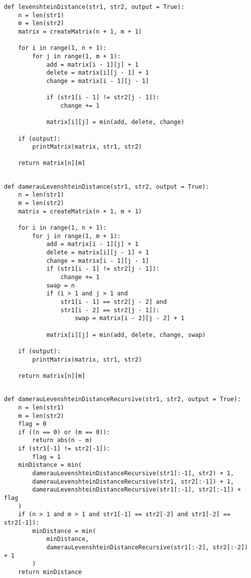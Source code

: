 \begin{lstlisting}[label=lst:non_rec_l,caption=Функция нахождения расстояния Левенштейна нерекурсивным методом]
def levenshteinDistance(str1, str2, output = True):
    n = len(str1)
    m = len(str2)
    matrix = createMatrix(n + 1, m + 1)

    for i in range(1, n + 1):
        for j in range(1, m + 1):
            add = matrix[i - 1][j] + 1
            delete = matrix[i][j - 1] + 1
            change = matrix[i - 1][j - 1]

            if (str1[i - 1] != str2[j - 1]):
                change += 1

            matrix[i][j] = min(add, delete, change)

    if (output):
        printMatrix(matrix, str1, str2)

    return matrix[n][m]
	
\end{lstlisting}

\begin{lstlisting}[label=lst:non_rec_dl,caption=Функция нахождения расстояния Дамерау--Левенштейна нерекурсивным методом]
def damerauLevenshteinDistance(str1, str2, output = True):
    n = len(str1)
    m = len(str2)
    matrix = createMatrix(n + 1, m + 1)

    for i in range(1, n + 1):
        for j in range(1, m + 1):
            add = matrix[i - 1][j] + 1
            delete = matrix[i][j - 1] + 1
            change = matrix[i - 1][j - 1]
            if (str1[i - 1] != str2[j - 1]):
                change += 1
            swap = n
            if (i > 1 and j > 1 and
                str1[i - 1] == str2[j - 2] and
                str1[i - 2] == str2[j - 1]):
                    swap = matrix[i - 2][j - 2] + 1

            matrix[i][j] = min(add, delete, change, swap)

    if (output):
        printMatrix(matrix, str1, str2)

    return matrix[n][m]
	
\end{lstlisting}

\begin{lstlisting}[label=lst:rec_dl,caption=Функция нахождения расстояния Дамерау--Левенштейна с использованием рекурсии]
def damerauLevenshteinDistanceRecursive(str1, str2, output = True):
    n = len(str1)
    m = len(str2)
    flag = 0
    if ((n == 0) or (m == 0)):
        return abs(n - m)
    if (str1[-1] != str2[-1]):
        flag = 1
    minDistance = min(
        damerauLevenshteinDistanceRecursive(str1[:-1], str2) + 1,
        damerauLevenshteinDistanceRecursive(str1, str2[:-1]) + 1,
        damerauLevenshteinDistanceRecursive(str1[:-1], str2[:-1]) + flag
    )
    if (n > 1 and m > 1 and str1[-1] == str2[-2] and str1[-2] == str2[-1]):
        minDistance = min(
            minDistance,
            damerauLevenshteinDistanceRecursive(str1[:-2], str2[:-2]) + 1
        )
    return minDistance
	
\end{lstlisting}

